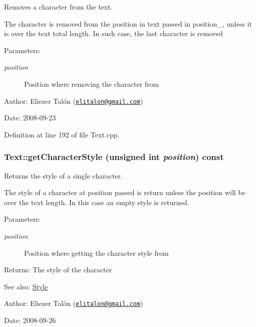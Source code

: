 Removes a character from the text. 

The character is removed from the position in text passed in position\_\-, unless it is over the text total length. In such case, the last character is removed

\begin{Desc}
\item[Parameters:]
\begin{description}
\item[{\em position}]Position where removing the character from\end{description}
\end{Desc}
\begin{Desc}
\item[Author:]Eliezer Talón (\href{mailto:elitalon@gmail.com}{\tt elitalon@gmail.com}) \end{Desc}
\begin{Desc}
\item[Date:]2008-09-23 \end{Desc}


Definition at line 192 of file Text.cpp.\hypertarget{class_text_7fec452bd51b06b53fbb5abc9c335459}{
\subsubsection[getCharacterStyle]{ Text::getCharacterStyle (unsigned int {\em position}) const}}
\label{class_text_7fec452bd51b06b53fbb5abc9c335459}


Returns the style of a single character. 

The style of a character at position passed is return unless the position will be over the text length. In this case an empty style is returned.

\begin{Desc}
\item[Parameters:]
\begin{description}
\item[{\em position}]Position where getting the character style from\end{description}
\end{Desc}
\begin{Desc}
\item[Returns:]The style of the character\end{Desc}
\begin{Desc}
\item[See also:]\hyperlink{class_style}{Style}\end{Desc}
\begin{Desc}
\item[Author:]Eliezer Talón (\href{mailto:elitalon@gmail.com}{\tt elitalon@gmail.com}) \end{Desc}
\begin{Desc}
\item[Date:]2008-09-26 \end{Desc}


